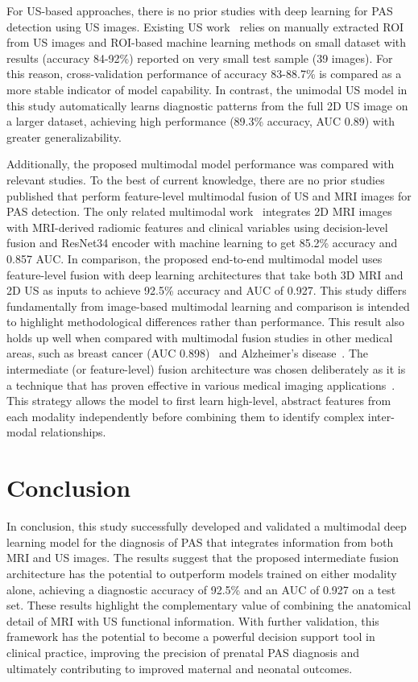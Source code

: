 \documentclass[12pt]{article}
\begin{document}
For US-based approaches, there is no prior studies with deep learning for PAS detection using US images. Existing US work~\cite{Young_2024} relies on manually extracted ROI from US images and ROI-based machine learning methods on small dataset with results (accuracy 84-92\%) reported on very small test sample (39 images). For this reason, cross-validation performance of accuracy 83-88.7\% is compared as a more stable indicator of model capability. In contrast, the unimodal US model in this study automatically learns diagnostic patterns from the full 2D US image on a larger dataset, achieving high performance (89.3\% accuracy, AUC 0.89) with greater generalizability.

Additionally, the proposed multimodal model performance was compared with relevant studies. To the best of current knowledge, there are no prior studies published that perform feature-level multimodal fusion of US and MRI images for PAS detection. The only related multimodal work~\cite{Ye_2022} integrates 2D MRI images with MRI-derived radiomic features and clinical variables using decision-level fusion and ResNet34 encoder with machine learning to get 85.2\% accuracy and 0.857 AUC. In comparison, the proposed end-to-end multimodal model uses feature-level fusion with deep learning architectures that take both 3D MRI and 2D US as inputs to achieve 92.5\% accuracy and AUC of 0.927. This study differs fundamentally from image-based multimodal learning and comparison is intended to highlight methodological differences rather than performance. This result also holds up well when compared with multimodal fusion studies in other medical areas, such as breast cancer (AUC 0.898)~\cite{Holste_2021} and Alzheimer's disease~\cite{Venugopalan_2021}. The intermediate (or feature-level) fusion architecture was chosen deliberately as it is a technique that has proven effective in various medical imaging applications~\cite{Holste_2021, Pei_2023}. This strategy allows the model to first learn high-level, abstract features from each modality independently before combining them to identify complex inter-modal relationships.

\section{Conclusion}

In conclusion, this study successfully developed and validated a multimodal deep learning model for the diagnosis of PAS that integrates information from both MRI and US images. The results suggest that the proposed intermediate fusion architecture has the potential to outperform models trained on either modality alone, achieving a diagnostic accuracy of 92.5\% and an AUC of 0.927 on a test set. These results highlight the complementary value of combining the anatomical detail of MRI with US functional information. With further validation, this framework has the potential to become a powerful decision support tool in clinical practice, improving the precision of prenatal PAS diagnosis and ultimately contributing to improved maternal and neonatal outcomes.
\end{document}
